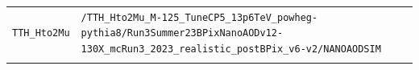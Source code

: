 \begin{longtable}{@{}>{\RaggedRight\arraybackslash}p{} >{\RaggedRight\arraybackslash}p{}@{}}
\addlinespace[2pt]
\texttt{TTH\_\allowbreak{}Hto2Mu} & \texttt{/\allowbreak{}TTH\_\allowbreak{}Hto2Mu\_\allowbreak{}M-\allowbreak{}125\_\allowbreak{}TuneCP5\_\allowbreak{}13p6TeV\_\allowbreak{}powheg-\allowbreak{}pythia8/\allowbreak{}Run3Summer23BPixNanoAODv12-\allowbreak{}130X\_\allowbreak{}mcRun3\_\allowbreak{}2023\_\allowbreak{}realistic\_\allowbreak{}postBPix\_\allowbreak{}v6-\allowbreak{}v2/\allowbreak{}NANOAODSIM} \\
\addlinespace[2pt]
\end{longtable}
